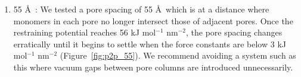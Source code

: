 \documentclass{article}
\begin{document}
\begin{enumerate}
	\item 55 \AA~: We tested a pore spacing of 55 \AA~which is at
	a distance where monomers in each pore no longer intersect those of adjacent pores. Once
	the restraining potential reaches 56 kJ mol$^{-1}$ nm$^{-2}$, the pore spacing
	changes erratically until it begins to settle when the force constants are
	below 3 kJ mol$^{-1}$ nm$^{-2}$ (Figure~\ref{fig:p2p_55}). We recommend
	avoiding a system such as this where vacuum gaps between pore columns are
	introduced unnecessarily. 

	\end{enumerate} 

\end{document}
